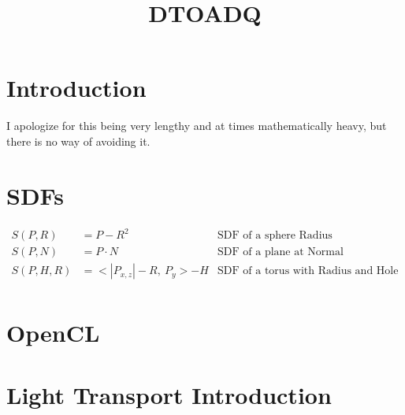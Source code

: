 \documentclass{article}
\title{DTOADQ}
\begin{document}
  \maketitle
  \section{Introduction}
    I apologize for this being very lengthy and at times mathematically heavy,
    but there is no way of avoiding it.

  \section{SDFs}
  \begin{align*}
    S(P, R) &= P - R^2   & \text{SDF of a sphere Radius  }\\
    S(P, N) &= P \cdot N  & \text{SDF of a plane at Normal}\\
    S(P, H, R) &= <|P_{x, z}| - R, \: P_{y}> - H & \text{SDF of a torus with
                                                  Radius and Hole}\\
  \end{align*}
  \section{OpenCL}
  \section{Light Transport Introduction}
\end{document}
